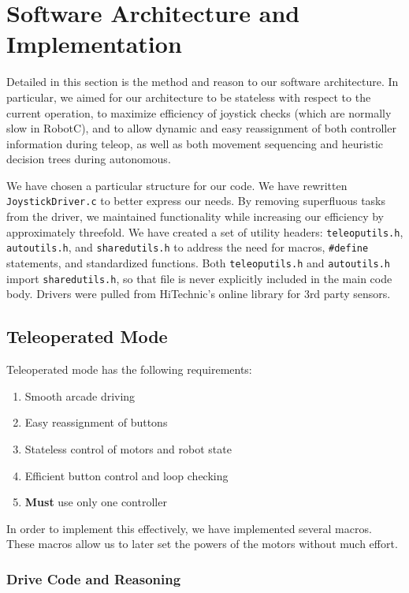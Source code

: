 \section{Software Architecture and Implementation}
Detailed in this section is the method and reason to our software architecture. In particular, we aimed for our architecture to be stateless with respect to the current operation, to maximize efficiency of joystick checks (which are normally slow in RobotC), and to allow dynamic and easy reassignment of both controller information during teleop, as well as both movement sequencing and heuristic decision trees during autonomous.

We have chosen a particular structure for our code. We have rewritten \lstinline{JoystickDriver.c}{} to better express our needs. By removing superfluous tasks from the driver, we maintained functionality while increasing our efficiency by approximately threefold. We have created a set of utility headers: \lstinline{teleoputils.h}{}, \lstinline{autoutils.h}{}, and \lstinline{sharedutils.h}{} to address the need for macros, \lstinline{#define}{} statements, and standardized functions. Both \lstinline{teleoputils.h}{} and \lstinline{autoutils.h}{} import \lstinline{sharedutils.h}{}, so that file is never explicitly included in the main code body. Drivers were pulled from HiTechnic's online library for 3rd party sensors.

\subsection{Teleoperated Mode}

Teleoperated mode has the following requirements: \begin{enumerate}
	\item{Smooth arcade driving}
	\item{Easy reassignment of buttons}
	\item{Stateless control of motors and robot state}
	\item{Efficient button control and loop checking}
	\item{\textbf{Must} use only one controller}
\end{enumerate}

In order to implement this effectively, we have implemented several macros. These macros allow us to later set the powers of the motors without much effort. 

\subsubsection{Drive Code and Reasoning}

